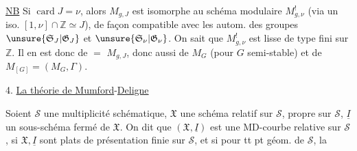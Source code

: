 \uline{NB} Si $\operatorname{card}J=\nu$, alors $M_{g,J}$ est isomorphe au schéma modulaire $M^!_{g,\nu}$ (via un iso. $[1,\nu]\cap\mathbb Z\simeq J$), de façon compatible avec les autom. des groupes $\unsure{\mathfrak S_J|\mathfrak G_J}$ et $\unsure{\mathfrak S_\nu|\mathfrak G_\nu}$. On sait que $M^!_{g,\nu}$ est lisse de type fini sur $\mathbb Z$. Il en est donc de $=$  $M_{g,J}$, donc aussi de $M_G$ (pour $G$ semi-stable) et de $M_{[G]}=(M_G,\Gamma)$.

4. \uline{La théorie de Mumford}-\uline{Deligne}

Soient $\mathcal S$ une multiplicité schématique, $\mathfrak X$ une  schéma relatif sur $\mathcal S$, propre sur $\mathcal S$, $\underline I$ un sous-schéma fermé de $\mathfrak X$. On dit que $(\mathfrak X,\underline I)$ est une MD-courbe relative sur $\mathcal S$, si $\mathfrak X,\underline I$ sont plats de présentation finie sur $\mathcal S$, et si pour tt pt géom. de $\mathcal S$, la
